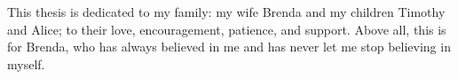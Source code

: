 \begin{frontmatter}
\begin{dedication}

 
This thesis is dedicated to my family: my wife Brenda and my children Timothy and Alice; to their love, encouragement, patience, and support. Above all, this is for Brenda, who has always believed in me and has never let me stop believing in myself.


%

\end{dedication}

\tableofcontents

\listoftables

\listoffigures

\end{frontmatter}
